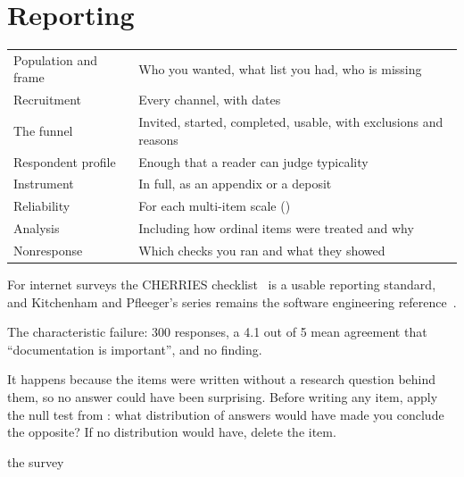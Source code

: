 \section{Reporting}

\begin{center}
\small
\begin{tabular}{@{}L{4.0cm}L{10.3cm}@{}}
\toprule
Population and frame  & Who you wanted, what list you had, who is missing \\
Recruitment           & Every channel, with dates \\
The funnel            & Invited, started, completed, usable, with exclusions
                        and reasons \\
Respondent profile    & Enough that a reader can judge typicality \\
Instrument            & In full, as an appendix or a deposit \\
Reliability           & For each multi-item scale () \\
Analysis              & Including how ordinal items were treated and why \\
Nonresponse           & Which checks you ran and what they showed \\
\bottomrule
\end{tabular}
\end{center}

For internet surveys the CHERRIES checklist~\cite{eysenbach2004improving} is a
usable reporting standard, and Kitchenham and Pfleeger's series remains the
software engineering reference~\cite{kitchenham2008personal}.

\begin{pitfall}
The characteristic failure: 300 responses, a 4.1 out of 5 mean agreement that
``documentation is important'', and no finding.

\medskip
It happens because the items were written without a research question behind
them, so no answer could have been surprising. Before writing any item, apply
the null test from : what distribution of answers would have
made you conclude the opposite? If no distribution would have, delete the item.
\end{pitfall}

\begin{traditions}{the survey}
\end{traditions}

